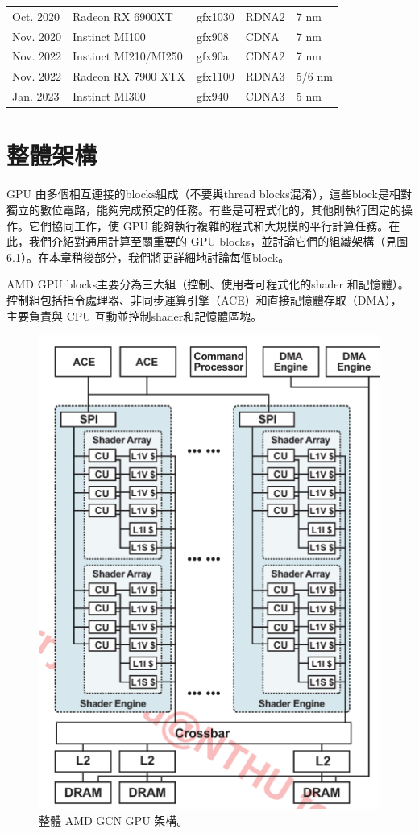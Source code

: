 \begin{table}[htbp]
\begin{tabular}{@{}lllll@{}}
        Oct. 2020            & Radeon RX 6900XT          & gfx1030       & RDNA2                 & 7 nm                     \\
        Nov. 2020            & Instinct MI100            & gfx908        & CDNA                  & 7 nm                     \\
        Nov. 2022            & Instinct MI210/MI250      & gfx90a        & CDNA2                 & 7 nm                     \\
        Nov. 2022            & Radeon RX 7900 XTX        & gfx1100       & RDNA3                 & 5/6 nm                   \\
        Jan. 2023            & Instinct MI300            & gfx940        & CDNA3                 & 5 nm                     \\ \bottomrule
    \end{tabular}
\end{table}

\section{整體架構}
GPU 由多個相互連接的blocks組成（不要與thread blocks混淆），這些block是相對獨立的數位電路，能夠完成預定的任務。有些是可程式化的，其他則執行固定的操作。它們協同工作，使 GPU 能夠執行複雜的程式和大規模的平行計算任務。在此，我們介紹對通用計算至關重要的 GPU blocks，並討論它們的組織架構（見圖6.1）。在本章稍後部分，我們將更詳細地討論每個block。

AMD GPU blocks主要分為三大組（控制、使用者可程式化的shader 和記憶體）。控制組包括指令處理器、非同步運算引擎（ACE）和直接記憶體存取（DMA），主要負責與 CPU 互動並控制shader和記憶體區塊。

\begin{figure}
    \centering
    \includegraphics[width=0.5\linewidth]{FileAusiliari//Screenshots/Figure6-1.png}
    \caption{整體 AMD GCN GPU 架構。}
    \label{fig:enter-label}
\end{figure}

